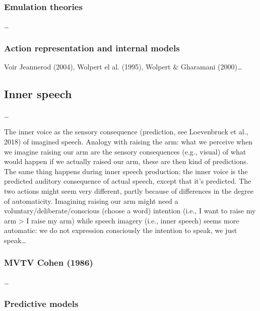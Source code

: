 \documentclass[12pt,]{book}
\theoremstyle{definition}
\theoremstyle{definition}
\theoremstyle{definition}
\theoremstyle{remark}
\begin{document}
\subsubsection{Emulation theories}\label{emulation-theories}

\ldots{}

\subsubsection{Action representation and internal
models}\label{action-representation-and-internal-models}

Voir Jeannerod (2004), Wolpert el al. (1995), Wolpert \& Gharamani
(2000)\ldots{}

\subsection{Inner speech}\label{inner-speech}

\ldots{}

The inner voice as the sensory consequence (prediction, see Loevenbruck
et al., 2018) of imagined speech. Analogy with raising the arm: what we
perceive when we imagine raising our arm are the sensory consequences
(e.g., visual) of what would happen if we actually raised our arm, these
are then kind of predictions. The same thing happens during inner speech
production: the inner voice is the predicted auditory consequence of
actual speech, except that it's predicted. The two actions might seem
very different, partly because of differences in the degree of
automaticity. Imagining raising our arm might need a
voluntary/deliberate/conscious (choose a word) intention (i.e., I want
to raise my arm \textgreater{} I raise my arm) while speech imagery
(i.e., inner speech) seems more automatic: we do not expression
consciously the intention to speak, we just speak\ldots{}

\subsubsection{MVTV Cohen (1986)}\label{mvtv-cohen-1986}

\ldots{}

\subsubsection{Predictive models}\label{predictive-models}
\end{document}
